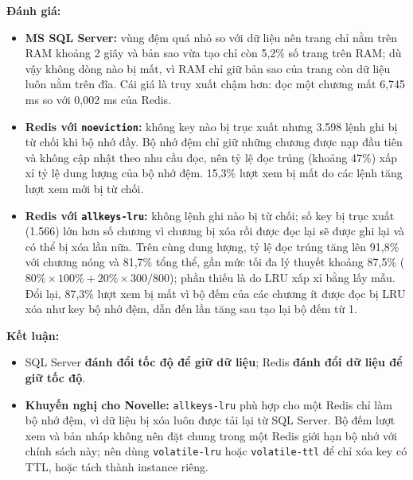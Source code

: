 \textbf{Đánh giá:}
\begin{itemize}
    \item \textbf{MS SQL Server:} vùng đệm quá nhỏ so với dữ liệu nên trang chỉ nằm trên RAM khoảng 2 giây và bản sao vừa tạo chỉ còn 5,2\% số trang trên RAM; dù vậy không dòng nào bị mất, vì RAM chỉ giữ bản sao của trang còn dữ liệu luôn nằm trên đĩa. Cái giá là truy xuất chậm hơn: đọc một chương mất 6,745 ms so với 0,002 ms của Redis.
    \item \textbf{Redis với \texttt{noeviction}:} không key nào bị trục xuất nhưng 3.598 lệnh ghi bị từ chối khi bộ nhớ đầy. Bộ nhớ đệm chỉ giữ những chương được nạp đầu tiên và không cập nhật theo nhu cầu đọc, nên tỷ lệ đọc trúng (khoảng 47\%) xấp xỉ tỷ lệ dung lượng của bộ nhớ đệm. 15,3\% lượt xem bị mất do các lệnh tăng lượt xem mới bị từ chối.
    \item \textbf{Redis với \texttt{allkeys-lru}:} không lệnh ghi nào bị từ chối; số key bị trục xuất (1.566) lớn hơn số chương vì chương bị xóa rồi được đọc lại sẽ được ghi lại và có thể bị xóa lần nữa. Trên cùng dung lượng, tỷ lệ đọc trúng tăng lên 91,8\% với chương nóng và 81,7\% tổng thể, gần mức tối đa lý thuyết khoảng 87,5\% ($80\% \times 100\% + 20\% \times 300/800$); phần thiếu là do LRU xấp xỉ bằng lấy mẫu. Đổi lại, 87,3\% lượt xem bị mất vì bộ đếm của các chương ít được đọc bị LRU xóa như key bộ nhớ đệm, dẫn đến lần tăng sau tạo lại bộ đếm từ 1.
\end{itemize}

\textbf{Kết luận:}
\begin{itemize}
    \item SQL Server \textbf{đánh đổi tốc độ để giữ dữ liệu}; Redis \textbf{đánh đổi dữ liệu để giữ tốc độ}.
    \item \textbf{Khuyến nghị cho Novelle:} \texttt{allkeys-lru} phù hợp cho một Redis chỉ làm bộ nhớ đệm, vì dữ liệu bị xóa luôn được tải lại từ SQL Server. Bộ đếm lượt xem và bản nháp không nên đặt chung trong một Redis giới hạn bộ nhớ với chính sách này; nên dùng \texttt{volatile-lru} hoặc \texttt{volatile-ttl} để chỉ xóa key có TTL, hoặc tách thành instance riêng.
\end{itemize}
\endgroup